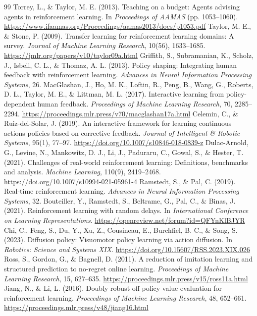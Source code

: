 \begin{thebibliography}{99}
 Torrey, L., \& Taylor, M. E. (2013). Teaching on a budget: Agents advising agents in reinforcement learning. In \emph{Proceedings of AAMAS} (pp. 1053--1060). \url{https://www.ifaamas.org/Proceedings/aamas2013/docs/p1053.pdf}
 Taylor, M. E., \& Stone, P. (2009). Transfer learning for reinforcement learning domains: A survey. \emph{Journal of Machine Learning Research}, 10(56), 1633--1685. \url{https://jmlr.org/papers/v10/taylor09a.html}
 Griffith, S., Subramanian, K., Scholz, J., Isbell, C. L., \& Thomaz, A. L. (2013). Policy shaping: Integrating human feedback with reinforcement learning. \emph{Advances in Neural Information Processing Systems}, 26. 
 MacGlashan, J., Ho, M. K., Loftin, R., Peng, B., Wang, G., Roberts, D. L., Taylor, M. E., \& Littman, M. L. (2017). Interactive learning from policy-dependent human feedback. \emph{Proceedings of Machine Learning Research}, 70, 2285--2294. \url{https://proceedings.mlr.press/v70/macglashan17a.html}
 Celemin, C., \& Ruiz-del-Solar, J. (2019). An interactive framework for learning continuous actions policies based on corrective feedback. \emph{Journal of Intelligent \& Robotic Systems}, 95(1), 77--97. \url{https://doi.org/10.1007/s10846-018-0839-z}
 Dulac-Arnold, G., Levine, N., Mankowitz, D. J., Li, J., Paduraru, C., Gowal, S., \& Hester, T. (2021). Challenges of real-world reinforcement learning: Definitions, benchmarks and analysis. \emph{Machine Learning}, 110(9), 2419--2468. \url{https://doi.org/10.1007/s10994-021-05961-4}
 Ramstedt, S., \& Pal, C. (2019). Real-time reinforcement learning. \emph{Advances in Neural Information Processing Systems}, 32. 
 Bouteiller, Y., Ramstedt, S., Beltrame, G., Pal, C., \& Binas, J. (2021). Reinforcement learning with random delays. In \emph{International Conference on Learning Representations}. \url{https://openreview.net/forum?id=QFYnKlBJYR}
 Chi, C., Feng, S., Du, Y., Xu, Z., Cousineau, E., Burchfiel, B. C., \& Song, S. (2023). Diffusion policy: Visuomotor policy learning via action diffusion. In \emph{Robotics: Science and Systems XIX}. \url{https://doi.org/10.15607/RSS.2023.XIX.026}
 Ross, S., Gordon, G., \& Bagnell, D. (2011). A reduction of imitation learning and structured prediction to no-regret online learning. \emph{Proceedings of Machine Learning Research}, 15, 627--635. \url{https://proceedings.mlr.press/v15/ross11a.html}
 Jiang, N., \& Li, L. (2016). Doubly robust off-policy value evaluation for reinforcement learning. \emph{Proceedings of Machine Learning Research}, 48, 652--661. \url{https://proceedings.mlr.press/v48/jiang16.html}

\end{thebibliography}

